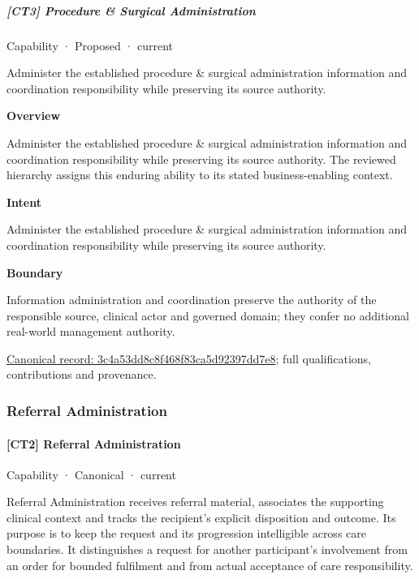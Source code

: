 \subparagraph{[CT3] Procedure \& Surgical Administration}

\label{element:3c4a53dd8c8f468f83ca5d92397dd7e8}
{\small Capability · Proposed · current}\par

Administer the established procedure \& surgical administration information and coordination responsibility while preserving its source authority.



\textbf{Overview}



Administer the established procedure \& surgical administration information and coordination responsibility while preserving its source authority. The reviewed hierarchy assigns this enduring ability to its stated business-enabling context.



\textbf{Intent}



Administer the established procedure \& surgical administration information and coordination responsibility while preserving its source authority.



\textbf{Boundary}



Information administration and coordination preserve the authority of the responsible source, clinical actor and governed domain; they confer no additional real-world management authority.


{\footnotesize \href{../../../../continuum/strategy/capability/3c4a53dd8c8f468f83ca5d92397dd7e8.md}{Canonical record: 3c4a53dd8c8f468f83ca5d92397dd7e8}; full qualifications, contributions and provenance.}\par
\subsubsection{Referral Administration}

\paragraph{[CT2] Referral Administration}

\label{element:ae0de25600ee416aa24d2a167b64f230}
{\small Capability · Canonical · current}\par

Referral Administration receives referral material, associates the supporting clinical context and tracks the recipient's explicit disposition and outcome. Its purpose is to keep the request and its progression intelligible across care boundaries. It distinguishes a request for another participant's involvement from an order for bounded fulfilment and from actual acceptance of care responsibility.



